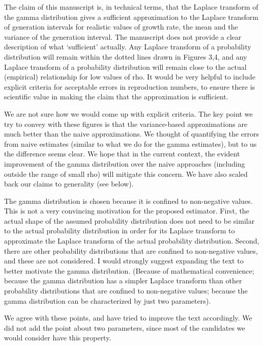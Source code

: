 \documentclass[12pt]{article}
\newcommand{\revtext}{\textsf}
\begin{document}
\revtext{The claim of this manuscript is, in technical terms, that the Laplace transform of the gamma distribution gives a sufficient approximation to the Laplace transform of generation intervals for realistic values of growth rate, the mean and the variance of the generation interval. The manuscript does not provide a clear description of what `sufficient’ actually. Any Laplace transform of a probability distribution will remain within the dotted lines drawn in Figures 3,4, and any Laplace transform of a probability distribution will remain close to the actual (empirical) relationship for low values of rho. It would be very helpful to include explicit criteria for acceptable errors in reproduction numbers, to ensure there is scientific value in making the claim that the approximation is sufficient.}

We are not sure how we would come up with explicit criteria. The key point we try to convey with these figures is that the variance-based approximations are much better than the naive approximations. We thought of quantifying the errors from naive estimates (similar to what we do for the gamma estimates), but to us the difference seems clear. We hope that in the current context, the evident improvement of the gamma distribution over the naive approaches (including outside the range of small rho) will mitigate this concern. We have also scaled back our claims to generality (see below).

\revtext{The gamma distribution is chosen because it is confined to non-negative values. This is not a very convincing motivation for the proposed estimator. First, the actual shape of the assumed probability distribution does not need to be similar to the actual probability distribution in order for its Laplace transform to approximate the Laplace transform of the actual probability distribution. Second, there are other probability distributions that are confined to non-negative values, and these are not considered. I would strongly suggest expanding the text to better motivate the gamma distribution. (Because of mathematical convenience; because the gamma distribution has a simpler Laplace transform than other probability distributions that are confined to non-negative values; because the gamma distribution can be characterized by just two parameters).}

We agree with these points, and have tried to improve the text accordingly. We did not add the point about two parameters, since most of the candidates we would consider have this property.
\end{document}
